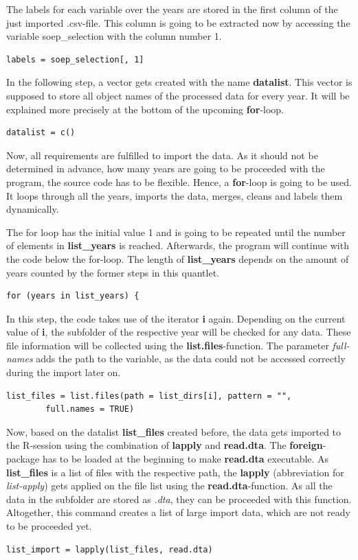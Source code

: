 \documentclass[a4paper]{article}
\begin{document}
The labels for each variable over the years are stored in the first column of the just imported .csv-file. This column is going to be extracted now by accessing the variable soep\_selection with the column number 1.
\begin{lstlisting}[firstnumber=24]
labels = soep_selection[, 1]
\end{lstlisting}

In the following step, a vector gets created with the name \textbf{datalist}. This vector is supposed to store all object names of the processed data for every year. It will be explained more precisely at the bottom of the upcoming \textbf{for}-loop.
\begin{lstlisting}[firstnumber=26]
datalist = c()
\end{lstlisting}
Now, all requirements are fulfilled to import the data.
As it should not be determined in advance, how many years are going to be proceeded with the program, the source code has to be flexible. Hence, a \textbf{for}-loop is going to be used. It loops through all the years, imports the data, merges, cleans and labels them dynamically. 

The for loop has the initial value 1 and is going to be repeated until the number of elements in \textbf{list\_years} is reached. Afterwards, the program will continue with the code below the for-loop. The length of \textbf{list\_years} depends on the amount of years counted by the former steps in this quantlet.
\begin{lstlisting}[firstnumber=30]
for (years in list_years) {
\end{lstlisting}

In this step, the code takes use of the iterator \textbf{i} again. Depending on the current value of \textbf{i}, the subfolder of the respective year will be checked for any data. These file information will be collected using the \textbf{list.files}-function. The parameter \textit{full-names} adds the path to the variable, as the data could not be accessed correctly during the import later on.
\begin{lstlisting}[firstnumber=21]
    list_files = list.files(path = list_dirs[i], pattern = "", 
    	full.names = TRUE)
\end{lstlisting}

Now, based on the datalist \textbf{list\_files} created before, the data gets imported to the R-session using the combination of \textbf{lapply} and \textbf{read.dta}. The \textbf{foreign}-package has to be loaded at the beginning to make \textbf{read.dta} executable. As \textbf{list\_files} is a list of files with the respective path, the \textbf{lapply} (abbreviation for \textit{list-apply}) gets applied on the file list using the \textbf{read.dta}-function. As all the data in the subfolder are stored as \textit{.dta}, they can be proceeded with this function. Altogether, this command creates a list of large import data, which are not ready to be proceeded yet.
\begin{lstlisting}[firstnumber=33]
    list_import = lapply(list_files, read.dta)
\end{lstlisting}
\end{document}
